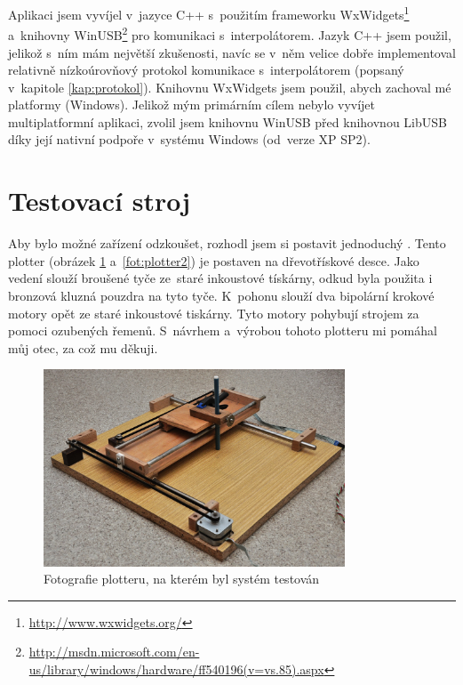 	Aplikaci jsem vyvíjel v~jazyce C++ s~použitím frameworku WxWidgets\footnote{\url{http://www.wxwidgets.org/}} a~knihovny {WinUSB}\footnote{\url{http://msdn.microsoft.com/en-us/library/windows/hardware/ff540196(v=vs.85).aspx}} pro komunikaci s~interpolátorem. Jazyk C++ jsem použil, jelikož s~ním mám největší zkušenosti, navíc se v~něm velice dobře implementoval relativně nízkoúrovňový protokol komunikace s~interpolátorem (popsaný v~kapitole \ref{kap:protokol}). Knihovnu WxWidgets jsem použil, abych zachoval  mé platformy (Windows). Jelikož mým primárním cílem nebylo vyvíjet multiplatformní aplikaci, zvolil jsem knihovnu WinUSB před knihovnou LibUSB díky její nativní podpoře v~systému Windows (od~verze XP SP2\cite{winusb}).
	
	\section{Testovací stroj}
	
	Aby bylo možné zařízení odzkoušet, rozhodl jsem si postavit jednoduchý . Tento plotter (obrázek \ref{fot:plotter} a~\ref{fot:plotter2}) je postaven na dřevotřískové desce. Jako vedení slouží broušené tyče ze~staré inkoustové tískárny, odkud byla použita i bronzová kluzná pouzdra na tyto tyče. K~pohonu slouží dva bipolární krokové motory opět ze staré inkoustové tiskárny. Tyto motory pohybují strojem za pomoci ozubených řemenů. S~návrhem a~výrobou tohoto plotteru mi pomáhal můj otec, za což mu děkuji.
	
	\begin{figure}[h]
		\centering
		\includegraphics[width=0.8\textwidth]{img/plotter.jpg}
		\caption{Fotografie plotteru, na kterém byl systém testován}\label{fot:plotter}	
	\end{figure}
	
